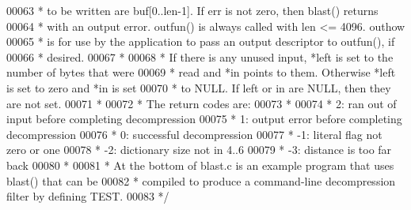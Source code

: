 \begin{DoxyCode}
00063 \textcolor{comment}{ * to be written are buf[0..len-1].  If err is not zero, then blast() returns}
00064 \textcolor{comment}{ * with an output error.  outfun() is always called with len <= 4096.  outhow}
00065 \textcolor{comment}{ * is for use by the application to pass an output descriptor to outfun(), if}
00066 \textcolor{comment}{ * desired.}
00067 \textcolor{comment}{ *}
00068 \textcolor{comment}{ * If there is any unused input, *left is set to the number of bytes that were}
00069 \textcolor{comment}{ * read and *in points to them.  Otherwise *left is set to zero and *in is set}
00070 \textcolor{comment}{ * to NULL.  If left or in are NULL, then they are not set.}
00071 \textcolor{comment}{ *}
00072 \textcolor{comment}{ * The return codes are:}
00073 \textcolor{comment}{ *}
00074 \textcolor{comment}{ *   2:  ran out of input before completing decompression}
00075 \textcolor{comment}{ *   1:  output error before completing decompression}
00076 \textcolor{comment}{ *   0:  successful decompression}
00077 \textcolor{comment}{ *  -1:  literal flag not zero or one}
00078 \textcolor{comment}{ *  -2:  dictionary size not in 4..6}
00079 \textcolor{comment}{ *  -3:  distance is too far back}
00080 \textcolor{comment}{ *}
00081 \textcolor{comment}{ * At the bottom of blast.c is an example program that uses blast() that can be}
00082 \textcolor{comment}{ * compiled to produce a command-line decompression filter by defining TEST.}
00083 \textcolor{comment}{ */}
\end{DoxyCode}
